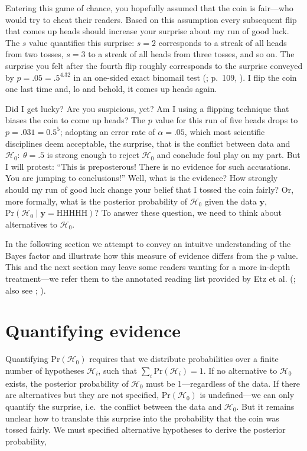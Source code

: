 \documentclass[
  man,
  floatsintext,
  longtable,
  nolmodern,
  notxfonts,
  notimes,
  colorlinks=true,linkcolor=blue,citecolor=blue,urlcolor=blue]{apa7}
\begin{document}
Entering this game of chance, you hopefully assumed that the coin is
fair---who would try to cheat their readers. Based on this assumption
every subsequent flip that comes up heads should increase your surprise
about my run of good luck. The \(s\) value quantifies this surprise:
\(s = 2\) corresponds to a streak of all heads from two tosses,
\(s = 3\) to a streak of all heads from three tosses, and so on. The
surprise you felt after the fourth flip roughly corresponds to the
surprise conveyed by \(p = .05 = .5^{4.32}\) in an one-sided exact
binomail test (; p.~109,
). I flip the coin one last
time and, lo and behold, it comes up heads again.

Did I get lucky? Are you suspicious, yet? Am I using a flipping
technique that biases the coin to come up heads? The \(p\) value for
this run of five heads drops to \(p = .031 = 0.5^5\); adopting an error
rate of \(\alpha = .05\), which most scientific disciplines deem
acceptable, the surprise, that is the conflict between data and
\(\mathcal{H}_0:~\theta = .5\) is strong enough to reject
\(\mathcal{H}_0\) and conclude foul play on my part. But I will protest:
``This is preposterous! There is no evidence for such accusations. You
are jumping to conclusions!'' Well, what is the evidence? How strongly
should my run of good luck change your belief that I tossed the coin
fairly? Or, more formally, what is the posterior probability of
\(\mathcal{H}_0\) given the data \(\mathbf{y}\),
\(\text{Pr}(\mathcal{H}_0 \mid \mathbf{y} = \text{{HHHHH}})\)? To answer
these question, we need to think about alternatives to
\(\mathcal{H}_0\).

In the following section we attempt to convey an intuitve understanding
of the Bayes factor and illustrate how this measure of evidence differs
from the \(p\) value. This and the next section may leave some readers
wanting for a more in-depth treatment---we refer them to the annotated
reading list provided by Etz et al. (; also
see ;
).

\section{Quantifying evidence}\label{quantifying-evidence}

Quantifying \(\text{Pr}(\mathcal{H}_0)\) requires that we distribute
probabilities over a finite number of hypotheses \(\mathcal{H}_i\), such
that \(\sum_i{\text{Pr}(\mathcal{H}_i)} = 1\). If no alternative to
\(\mathcal{H}_0\) exists, the posterior probability of \(\mathcal{H}_0\)
must be 1---regardless of the data. If there are alternatives but they
are not specified, \(\text{Pr}(\mathcal{H}_0)\) is undefined---we can
only quantify the surprise, i.e.~the conflict between the data and
\(\mathcal{H}_0\). But it remains unclear how to translate this surprise
into the probability that the coin was tossed fairly. We must specified
alternative hypotheses to derive the posterior probability,
\end{document}
